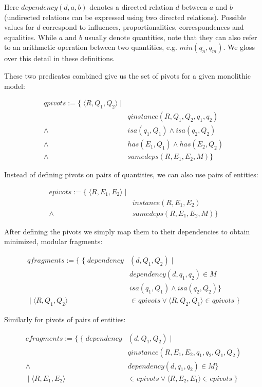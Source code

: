 \documentclass{article} %
\begin{document}
Here $dependency(d, a, b)$ denotes a directed relation $d$ between $a$
and $b$ (undirected relations can be expressed using two directed relations).
Possible values for $d$ correspond to influences, proportionalities,
correspondences and equalities. While $a$ and $b$ usually denote quantities,
note that they can also refer to an arithmetic operation between two
quantities, e.g. $min(q_n, q_m)$. We gloss over this detail in these
definitions.

These two predicates combined give us the set of pivots for a given
monolithic model:

\begin{align*}
qpivots := \{ \; \langle R, Q_1, Q_2 \rangle \; | \\
	\; &qinstance(R, Q_1, Q_2, q_1, q_2) \\
	\land \; &isa(q_1, Q_1) \land isa(q_2, Q_2) \\
	\land \; &has(E_1, Q_1) \land has(E_2, Q_2) \\
	\land \; &samedeps(R, E_1, E_2, M) \} 
\end{align*}

Instead of defining pivots on pairs of quantities, we can also use pairs
of entities:

\begin{align*}
epivots := \{ \; \langle R, E_1, E_2 \rangle \; | \\ 
	\; &instance(R, E_1, E_2)  \\
	\land &samedeps(R, E_1, E_2, M) \} 
\end{align*}

After defining the pivots we simply map them to their dependencies to obtain
minimized, modular fragments:

\begin{align*}
qfragments := \{ \; \{ \; dependency&(d, Q_1, Q_2) \; | \; \\
		& dependency(d, q_1, q_2)  \in M \\
		& isa(q_1, Q_1) \land isa(q_2, Q_2) \} \\
	\; | \; \langle R, Q_1, Q_2 \rangle &\in qpivots \lor 
	\langle R, Q_2, Q_1 \rangle \in qpivots \; \}
\end{align*}

Similarly for pivots of pairs of entities:

\begin{align*}
efragments := \{ \; \{ \; dependency&(d, Q_1, Q_2) \; | \; \\
		& qinstance(R, E_1, E_2, q_1, q_2, Q_1, Q_2) \\
		\land \; & dependency(d, q_1, q_2)  \in M \} \\
	\; | \; \langle R, E_1, E_2 \rangle &\in epivots \lor 
	\langle R, E_2, E_1 \rangle \in epivots \; \}
\end{align*}
\end{document}

